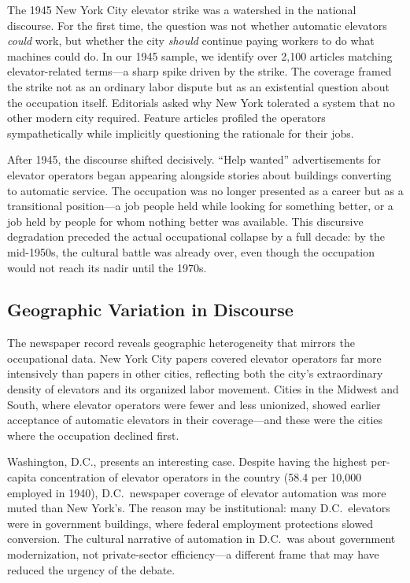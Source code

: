 \documentclass[12pt]{article}
\begin{document}
The 1945 New York City elevator strike was a watershed in the national discourse. For the first time, the question was not whether automatic elevators \emph{could} work, but whether the city \emph{should} continue paying workers to do what machines could do. In our 1945 sample, we identify over 2,100 articles matching elevator-related terms---a sharp spike driven by the strike. The coverage framed the strike not as an ordinary labor dispute but as an existential question about the occupation itself. Editorials asked why New York tolerated a system that no other modern city required. Feature articles profiled the operators sympathetically while implicitly questioning the rationale for their jobs.

After 1945, the discourse shifted decisively. ``Help wanted'' advertisements for elevator operators began appearing alongside stories about buildings converting to automatic service. The occupation was no longer presented as a career but as a transitional position---a job people held while looking for something better, or a job held by people for whom nothing better was available. This discursive degradation preceded the actual occupational collapse by a full decade: by the mid-1950s, the cultural battle was already over, even though the occupation would not reach its nadir until the 1970s.

\subsection{Geographic Variation in Discourse}

The newspaper record reveals geographic heterogeneity that mirrors the occupational data. New York City papers covered elevator operators far more intensively than papers in other cities, reflecting both the city's extraordinary density of elevators and its organized labor movement. Cities in the Midwest and South, where elevator operators were fewer and less unionized, showed earlier acceptance of automatic elevators in their coverage---and these were the cities where the occupation declined first.

Washington, D.C., presents an interesting case. Despite having the highest per-capita concentration of elevator operators in the country (58.4 per 10,000 employed in 1940), D.C.\ newspaper coverage of elevator automation was more muted than New York's. The reason may be institutional: many D.C.\ elevators were in government buildings, where federal employment protections slowed conversion. The cultural narrative of automation in D.C.\ was about government modernization, not private-sector efficiency---a different frame that may have reduced the urgency of the debate.
\end{document}

